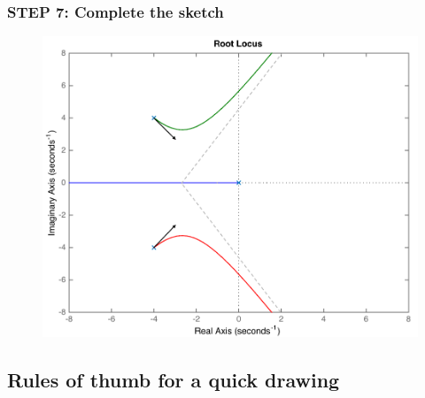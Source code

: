 \begin{frame}
\frametitle{STEP 7: Complete the sketch}	
	\begin{figure}
		\centering
		\includegraphics[width=0.7\linewidth]{how_to_draw_ex5}
	\end{figure}
\end{frame}

\subsection{Rules of thumb for a quick drawing}

